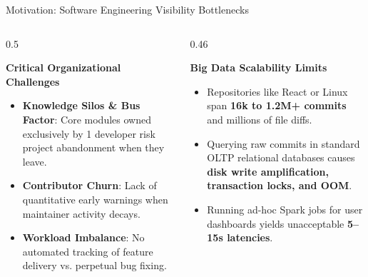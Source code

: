 \documentclass[aspectratio=169, 10pt]{beamer}
\begin{document}
\begin{frame}{Motivation: Software Engineering Visibility Bottlenecks}
  \begin{columns}[T]
    \begin{column}{0.5\textwidth}
      \begin{alertblock}{\textbf{Critical Organizational Challenges}}
        \begin{itemize}
          \item \textbf{Knowledge Silos \& Bus Factor}: Core modules owned exclusively by 1 developer risk project abandonment when they leave.
          \item \textbf{Contributor Churn}: Lack of quantitative early warnings when maintainer activity decays.
          \item \textbf{Workload Imbalance}: No automated tracking of feature delivery vs. perpetual bug fixing.
        \end{itemize}
      \end{alertblock}
    \end{column}
    
    \begin{column}{0.46\textwidth}
      \begin{block}{\textbf{Big Data Scalability Limits}}
        \begin{itemize}
          \item Repositories like React or Linux span \textbf{16k to 1.2M+ commits} and millions of file diffs.
          \item Querying raw commits in standard OLTP relational databases causes \textbf{disk write amplification, transaction locks, and OOM}.
          \item Running ad-hoc Spark jobs for user dashboards yields unacceptable \textbf{5--15s latencies}.
        \end{itemize}
      \end{block}
    \end{column}
  \end{columns}
\end{frame}
\end{document}
